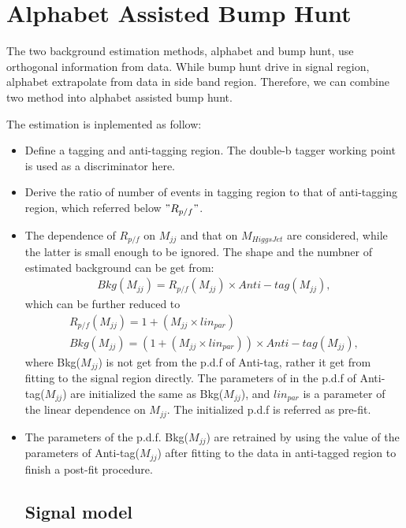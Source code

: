 \clearpage
\section{Alphabet Assisted Bump Hunt}
The two background estimation methods, alphabet and bump hunt, use orthogonal information from data.
While bump hunt drive in signal region, alphabet extrapolate from data in side band region. 
Therefore, we can combine two method into alphabet assisted bump hunt.

The estimation is inplemented as follow:
\begin{itemize}
\item Define a tagging and anti-tagging region. The double-b tagger working point is used as a discriminator here.
\item Derive the ratio of number of events in tagging region to that of anti-tagging region, which referred below $" R_{p/f} "$.
\item The dependence of $R_{p/f}$ on $M_{jj}$ and that on $M_{Higgs Jet}$ are considered, while the latter is small enough to be ignored. The shape and the numbner of estimated background can be get from:
\begin{equation} \label{eq3}
\begin{split}
Bkg(M_{jj})= R_{p/f}(M_{jj}) \times Anti-tag(M_{jj}), 
\end{split}
\end{equation}
which can be further reduced to 
\begin{equation} \label{eq4}
\begin{split}
R_{p/f}(M_{jj})= 1+(M_{jj} \times lin_{par}) \\
Bkg(M_{jj})= (1+(M_{jj} \times lin_{par})) \times Anti-tag(M_{jj}),
\end{split}
\end{equation}
where Bkg($M_{jj}$) is not get from the p.d.f of Anti-tag, rather it get from fitting to the signal region directly.
The parameters of in the p.d.f of Anti-tag($M_{jj}$) are initialized the same as Bkg($M_{jj}$), and $lin_{par}$ is a parameter of the linear dependence on $M_{jj}$. The initialized p.d.f is referred as pre-fit.
\item  The parameters of the p.d.f. Bkg($M_{jj}$) are retrained by using the value of the parameters of Anti-tag($M_{jj}$) after fitting to the data in anti-tagged region to finish a post-fit procedure. 
\subsection{Signal model}

\end{itemize}
